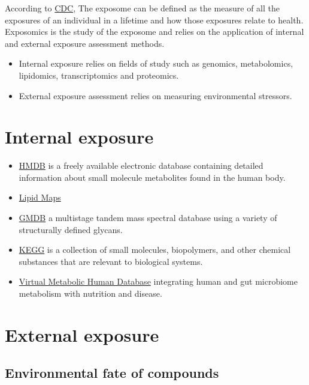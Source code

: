 \documentclass[
]{book}
\begin{document}
According to \href{https://www.cdc.gov/niosh/topics/exposome/default.html}{CDC}, The exposome can be defined as the measure of all the exposures of an individual in a lifetime and how those exposures relate to health. Exposomics is the study of the exposome and relies on the application of internal and external exposure assessment methods.

\begin{itemize}
\item
  Internal exposure relies on fields of study such as genomics, metabolomics, lipidomics, transcriptomics and proteomics.
\item
  External exposure assessment relies on measuring environmental stressors.
\end{itemize}

\hypertarget{internal-exposure}{%
\section{Internal exposure}\label{internal-exposure}}

\begin{itemize}
\item
  \href{http://www.hmdb.ca/}{HMDB} is a freely available electronic database containing detailed information about small molecule metabolites found in the human body.
\item
  \href{http://www.lipidmaps.org/}{Lipid Maps}
\item
  \href{https://jcggdb.jp/rcmg/glycodb/Ms_ResultSearch}{GMDB} a multistage tandem mass spectral database using a variety of structurally defined glycans.
\item
  \href{https://www.genome.jp/kegg/compound/}{KEGG} is a collection of small molecules, biopolymers, and other chemical substances that are relevant to biological systems.
\item
  \href{https://www.vmh.life/}{Virtual Metabolic Human Database} integrating human and gut microbiome metabolism with nutrition and disease.
\end{itemize}

\hypertarget{external-exposure}{%
\section{External exposure}\label{external-exposure}}

\hypertarget{environmental-fate-of-compounds}{%
\subsection{Environmental fate of compounds}\label{environmental-fate-of-compounds}}
\end{document}
